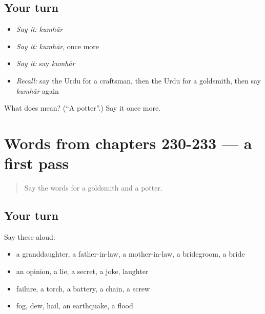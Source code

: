 \subsection*{Your turn}
\begin{itemize}
\raggedright
  \item \emph{Say it:} \emph{kumhār}
  \item \emph{Say it:} \emph{kumhār}, once more
  \item \emph{Say it:} say \emph{kumhār}
  \item \emph{Recall:} say the Urdu for a craftsman, then the Urdu for a goldsmith, then say \emph{kumhār} again
\end{itemize}

\begin{tcolorbox}[breakable,colback=teal!4,colframe=teal!35!black,title={Before you move on}]
What does  mean? (\textquotedblleft{}A potter\textquotedblright{}.) Say it once more.
\end{tcolorbox}
\section[(dialogue)]{Words from chapters 230-233 — a first pass}

\label{lesson:UR-R238-first-pass-words-from-chapters-230-233}



\begin{quote}
Say the words for a goldsmith and a potter.
\end{quote}

\subsection*{Your turn}
Say these aloud:

\begin{itemize}
\raggedright
  \item a granddaughter, a father-in-law, a mother-in-law, a bridegroom, a bride
  \item an opinion, a lie, a secret, a joke, laughter
  \item failure, a torch, a battery, a chain, a screw
  \item fog, dew, hail, an earthquake, a flood
\end{itemize}

